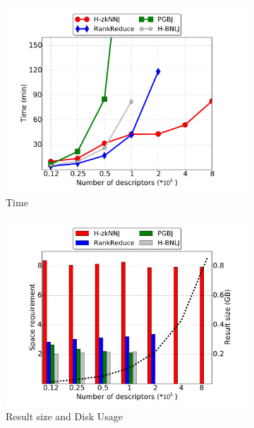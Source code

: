 \begin{figure}[htp]
	\centering
	\begin{subfigure}[b]{0.35\textwidth}
		\includegraphics[width=\textwidth]{img-perf/surf/data/time.pdf}
		\caption{Time\label{fig:surf_data_time}}    
	\end{subfigure}%
	\begin{subfigure}[b]{0.35\textwidth}
		\includegraphics[width=\textwidth]{img-perf/surf/data/memory.pdf}
		\caption{Result size and Disk Usage\label{fig:surf_data_memory}}
	\end{subfigure}%
	\begin{subfigure}[b]{0.35\textwidth}

\end{subfigure}
\end{figure}
